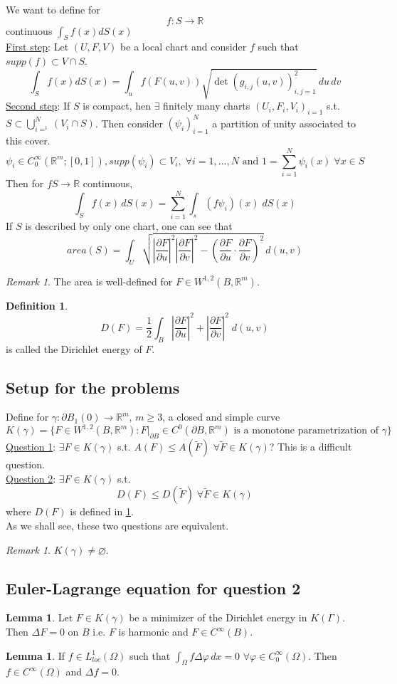 \documentclass[a4paper, 12pt]{article}
\theoremstyle{plain}
\theoremstyle{definition}
\newtheorem{definition}[theorem]{Definition} %
\theoremstyle{lemma}
\newtheorem{lemma}[theorem]{Lemma}
\theoremstyle{remark}
\newtheorem{remark}[theorem]{Remark}
\theoremstyle{corollary}
\theoremstyle{example}
\begin{document}
	We want to define for \[f: S \to \mathbb{R}\] continuous $\int_S f(x) dS(x)$\\
	\underline{First step}: Let $(U,F,V)$ be a local chart and consider $f$ such that $supp(f) \subset V \cap S$. \[\int_S f(x) dS(x) = \int_u f(F(u,v)) \sqrt{\det(g_{i,j}(u,v))^2_{i,j=1}} \, du \, dv\]
	\underline{Second step}: If $S$ is compact, hen $\exists$ finitely many charts $(U_i,F_i,V_i)_{i=1}$ s.t. $S \subset \bigcup_{i=^1}^N (V_i \cap S)$. Then consider $(\psi_i)_{i=1}^N$ a partition of unity associated to this cover. \[\psi_i \in C_0^\infty(\mathbb{R}^m; [0,1]), supp(\psi_i) \subset V_i, \; \forall i=1,...,N \text{ and } 1 = \sum_{i=1}^N \psi_i(x) \; \forall x \in S\]
	Then for $fS \to \mathbb{R}$ continuous, \[\int_S f(x) \, dS(x) = \sum_{i=1}^N \int_s (f\psi_i)(x) \; dS(x)\] If $S$ is described by only one chart, one can see that \[area(S) = \int_U \sqrt{\left|\frac{\partial F}{\partial u}\right|^2 \left|\frac{\partial F}{\partial v}\right|^2 - \left(\frac{\partial F}{\partial u} \cdot \frac{\partial F}{\partial v}\right)^2} \, d(u,v)\]
	\begin{remark}
		The area is well-defined for $F\in W^{1,2}(B,\mathbb{R}^m)$. 
	\end{remark}
	\begin{definition} \label{def: D(F)}
		\[D(F) = \frac{1}{2} \int_B \left|\frac{\partial F}{\partial u}\right|^2 + \left|\frac{\partial F}{\partial v}\right|^2 \; d(u,v)\] is called the Dirichlet energy of $F$.
	\end{definition}
	\subsection{Setup for the problems}
	Define for $\gamma: \partial B_1(0) \to \mathbb{R}^m$, $m \geq 3$, a closed and simple curve \[K(\gamma) = \{F \in W^{1,2} (B,\mathbb{R}^m): F|_{\partial B} \in C^0(\partial B, \mathbb{R}^m) \text{ is a monotone parametrization of } \gamma\}\]
	\underline{Question 1}: $\exists F \in K(\gamma)$ s.t. $A(F) \leq A(\tilde F)$ $\forall \tilde F \in K(\gamma)$? This is a difficult question.\\
	\underline{Question 2}: $\exists F \in K(\gamma)$ s.t. \[D(F) \leq D(\tilde F) \; \forall \tilde F \in K(\gamma)\] where $D(F)$ is defined in \ref{def: D(F)}.\\
	As we shall see, these two questions are equivalent.
	\begin{remark}
		$K(\gamma) \neq \varnothing$.
	\end{remark}
	\subsection{Euler-Lagrange equation for question 2}
	\begin{lemma}
		Let $F \in K(\gamma)$ be a minimizer of the Dirichlet energy in $K(\Gamma)$. Then $\Delta F = 0$ on $B$ i.e. $F$ is harmonic and $F \in C^\infty(B)$.
	\end{lemma}
	\begin{lemma}
		If $f \in L^1_{loc}(\Omega)$ such that $\int_\Omega f \Delta \varphi \, dx = 0$ $\forall \varphi \in C_0^\infty(\Omega)$. Then $f \in C^\infty(\Omega)$ and $\Delta f = 0$.
	\end{lemma}
\end{document}
